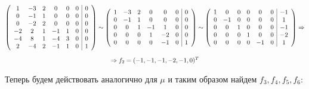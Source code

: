 \documentclass[11pt]{article}
\begin{document}
$$
\begin{gathered}
\begin{pmatrix}
\begin{array}{c c c c c c|c}
1 & -3 & 2 & 0 & 0 & 0 & 0 \\
0 & -1 & 1 & 0 & 0 & 0 & 0 \\
0 & -2 & 2 & 0 & 0 & 0 & 0 \\
-2 & 2 & 1 & -1 & 1 & 0 & 0 \\
-4 & 8 & 1 & -4 & 3 & 0 & 0 \\
2 & -4 & 2 & -1 & 1 & 0 & 1
\end{array}
\end{pmatrix} \sim
\begin{pmatrix}
\begin{array}{c c c c c c|c}
1 & -3 & 2 & 0 & 0 & 0 & 0 \\
0 & -1 & 1 & 0 & 0 & 0 & 0 \\
0 & 0 & 1 & -1 & 1 & 0 & 0 \\
0 & 0 & 0 & 1 & -2 & 0 & 0 \\
0 & 0 & 0 & 0 & -1 & 0 & 1 \\
\end{array}
\end{pmatrix} \sim
\begin{pmatrix}
\begin{array}{c c c c c c|c}
1 & 0 & 0 & 0 & 0 & 0 & -1 \\
0 & -1 & 0 & 0 & 0 & 0 & 1 \\
0 & 0 & 1 & 0 & 0 & 0 & -1 \\
0 & 0 & 0 & 1 & 0 & 0 & -2 \\
0 & 0 & 0 & 0 & -1 & 0 & 1 \\
\end{array}
\end{pmatrix} \Rightarrow \\[6pt] \Rightarrow f_2 = (-1, -1, -1, -2, -1, 0)^T
\end{gathered}
$$

Теперь будем действовать аналогично для $\mu$ и таким образом найдем $f_3, f_4, f_5, f_6$:
\end{document}
